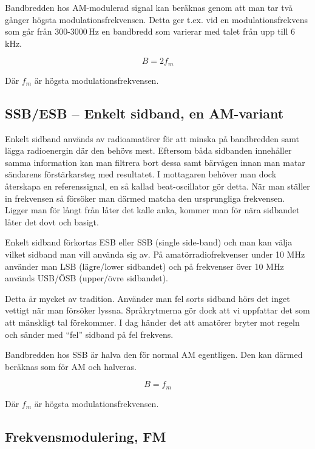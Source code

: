 Bandbredden hos AM-modulerad signal kan beräknas genom att man tar två gånger
högsta modulationsfrekvensen. Detta ger t.ex. vid en modulationsfrekvens som
går från 300-3000\,Hz en bandbredd som varierar med talet från upp till
6\,kHz.

\begin{equation}
	B=2f_m
\end{equation}

Där $f_m$ är högsta modulationsfrekvensen.

\subsection{SSB/ESB -- Enkelt sidband, en AM-variant}
    
 

Enkelt sidband används av radioamatörer för att minska på bandbredden samt
lägga radioenergin där den behövs mest. Eftersom båda sidbanden innehåller
samma information kan man filtrera bort dessa samt bärvågen innan man matar
sändarens förstärkarsteg med resultatet. I mottagaren behöver man dock
återskapa en referenssignal, en så kallad beat-oscillator gör detta. När man
ställer in frekvensen så försöker man därmed matcha den ursprungliga
frekvensen. Ligger man för långt från låter det kalle anka, kommer man för
nära sidbandet låter det dovt och basigt.

Enkelt sidband förkortas ESB eller SSB (single side-band) och man kan välja
vilket sidband man vill använda sig av. På amatörradiofrekvenser under 10 MHz
använder man LSB (lägre/lower sidbandet) och på frekvenser över 10 MHz används
USB/ÖSB (upper/övre sidbandet).

Detta är mycket av tradition. Använder man fel sorts sidband hörs det inget
vettigt när man försöker lyssna. Språkrytmerna gör dock att vi uppfattar det
som att mänskligt tal förekommer. I dag händer det att amatörer bryter mot
regeln och sänder med ``fel'' sidband på fel frekvens.

Bandbredden hos SSB är halva den för normal AM egentligen. Den kan därmed
beräknas som för AM och halveras.

\begin{equation}
	B=f_m
\end{equation}

Där $f_m$ är högsta modulationsfrekvensen.

\subsection{Frekvensmodulering, FM}

